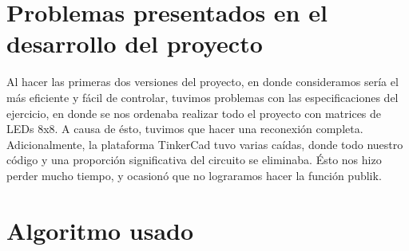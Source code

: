 \documentclass{article}
\begin{document}
\section{Problemas presentados en el desarrollo del proyecto} \label{contenido}
Al hacer las primeras dos versiones del proyecto, en donde consideramos sería el más eficiente y fácil de controlar, tuvimos problemas con las especificaciones del ejercicio, en donde se nos ordenaba realizar todo el proyecto con matrices de LEDs 8x8. A causa de ésto, tuvimos que hacer una reconexión completa. Adicionalmente, la plataforma TinkerCad tuvo varias caídas, donde todo nuestro código y una proporción significativa del circuito se eliminaba. Ésto nos hizo perder mucho tiempo, y ocasionó que no lograramos hacer la función publik.
\section{Algoritmo usado} \label{contenido}
\end{document}
